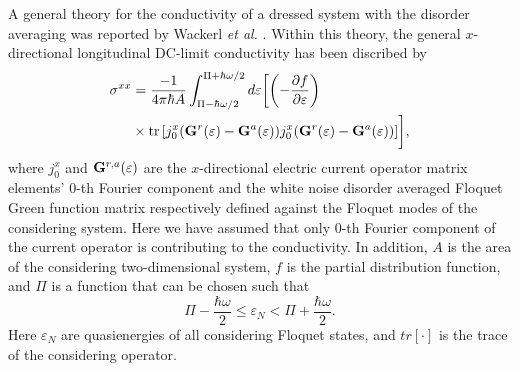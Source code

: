 
A general theory for the conductivity of a dressed system with the disorder averaging was reported by Wackerl \textit{et al.} \cite{wackerl20,wackerlthesis20}. Within this theory, the general $x$-directional longitudinal DC-limit conductivity has been discribed by
\begin{equation} \label{eq_20}
  \begin{aligned}
    {\sigma}^{xx} &=
    \frac{-1}{4\pi\hbar A}
    \int_{\Pi-\hbar\omega/2}^{\Pi+ \hbar\omega/2} d\varepsilon \bigg[
    \qty(
    -\frac{\partial f}{\partial \varepsilon})
    \\
    & \times
    \tr
    \qty[
    {j}^x_0
    \qty(
    \vb{G}^{r} (\varepsilon) - \vb{G}^{a} (\varepsilon)
    )
    {j}^x_0
    \qty(
    \vb{G}^{r} (\varepsilon) - \vb{G}^{a} (\varepsilon)
    )
    ]\bigg],
  \end{aligned}
\end{equation}
where ${j}^x_0$ and $\vb{G}^{r,a} (\varepsilon)$ are the $x$-directional electric current operator matrix elements' $0$-th Fourier component and the white noise disorder averaged Floquet Green function matrix \cite{wackerl20,wackerlthesis20} respectively defined against the Floquet modes of the considering system. Here we have assumed that only $0$-th Fourier component of the current operator is contributing to the conductivity. In addition, $A$ is the area of the considering two-dimensional system, $f$ is the partial distribution function, and $\Pi$ is a function that can be chosen such that
\begin{equation} \label{eq_21}
    \Pi- \frac{\hbar \omega}{2}
    \leq \varepsilon_N
    <
    \Pi + \frac{\hbar \omega}{2}.
\end{equation}
Here $ \varepsilon_N$ are quasienergies of all considering Floquet states, and $tr[\cdot]$ is the trace of the considering operator.

